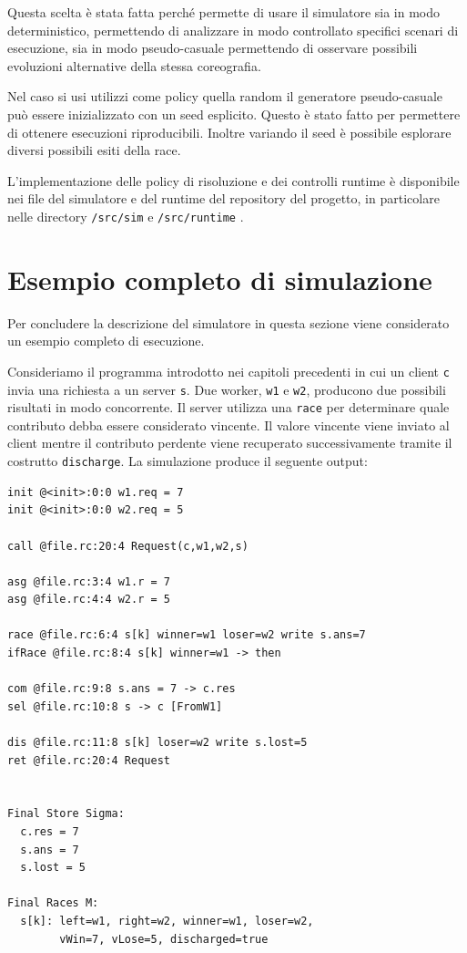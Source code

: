 Questa scelta è stata fatta perché permette di usare il simulatore sia in modo deterministico, permettendo di analizzare in modo controllato specifici scenari di esecuzione, sia in modo pseudo-casuale permettendo di osservare possibili evoluzioni alternative della stessa coreografia.

Nel caso si usi utilizzi come policy quella random il generatore pseudo-casuale può essere inizializzato con un seed esplicito. Questo è stato fatto per permettere di ottenere esecuzioni riproducibili. Inoltre variando il seed è possibile esplorare diversi possibili esiti della race.

L’implementazione delle policy di risoluzione e dei controlli runtime è disponibile nei file del simulatore e del runtime del repository del progetto, in particolare nelle directory \texttt{/src/sim} e \texttt{/src/runtime} \cite{rcparserrepo}.

\section{Esempio completo di simulazione}

Per concludere la descrizione del simulatore in questa sezione viene considerato un esempio completo di esecuzione.

Consideriamo il programma introdotto nei capitoli precedenti in cui un client \texttt{c} invia una richiesta a un server \texttt{s}. Due worker, \texttt{w1} e \texttt{w2}, producono due possibili risultati in modo concorrente. Il server utilizza una \texttt{race} per determinare quale contributo debba essere considerato vincente. Il valore vincente viene inviato al client mentre il contributo perdente viene recuperato successivamente tramite il costrutto \texttt{discharge}.
La simulazione produce il seguente output:
\begin{tcolorbox}[colback=black!2,colframe=black!35,boxrule=0.4pt]
\begin{verbatim}
init @<init>:0:0 w1.req = 7
init @<init>:0:0 w2.req = 5

call @file.rc:20:4 Request(c,w1,w2,s)

asg @file.rc:3:4 w1.r = 7
asg @file.rc:4:4 w2.r = 5

race @file.rc:6:4 s[k] winner=w1 loser=w2 write s.ans=7
ifRace @file.rc:8:4 s[k] winner=w1 -> then

com @file.rc:9:8 s.ans = 7 -> c.res
sel @file.rc:10:8 s -> c [FromW1]

dis @file.rc:11:8 s[k] loser=w2 write s.lost=5
ret @file.rc:20:4 Request


Final Store Sigma:
  c.res = 7
  s.ans = 7
  s.lost = 5

Final Races M:
  s[k]: left=w1, right=w2, winner=w1, loser=w2,
        vWin=7, vLose=5, discharged=true
\end{verbatim}
\end{tcolorbox}

